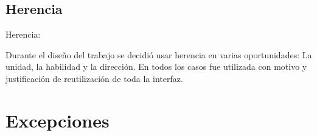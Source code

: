 \documentclass[titlepage,a4paper]{article}
\begin{document}
\subsection{Herencia}

Herencia: 

Durante el diseño del trabajo se decidió usar herencia en varias oportunidades: La unidad, la habilidad y la dirección. En todos los casos fue utilizada con motivo y justificación de reutilización de toda la interfaz. 



\section{Excepciones}\label{sec:excepciones}
\end{document}
